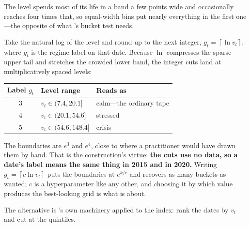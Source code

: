 The level spends most of its life in a band a few points wide and occasionally reaches four times
that, so equal-width bins put nearly everything in the first one---the opposite of what
's bucket test needs.

\begin{definition}\label{def:log-ceiling}
Take the natural log of the level and round up to the next integer,
$g_t = \left\lceil \ln v_t \right\rceil$, where $g_t$ is the regime label on that date. Because
$\ln$ compresses the sparse upper tail and stretches the crowded lower band, the integer cuts land
at multiplicatively spaced levels:

\begin{center}
\begin{tabular}{|c|l|l|}
\hline
\textbf{Label $g_t$} & \textbf{Level range} & \textbf{Reads as} \\ \hline
3 & $v_t \in (7.4, 20.1]$   & calm---the ordinary tape \\ \hline
4 & $v_t \in (20.1, 54.6]$  & stressed \\ \hline
5 & $v_t \in (54.6, 148.4]$ & crisis \\ \hline
\end{tabular}
\end{center}
\end{definition}

The boundaries are $e^3$ and $e^4$, close to where a practitioner would have drawn them by hand.
That is the construction's virtue: \textbf{the cuts use no data, so a date's label means the same
thing in 2015 and in 2020.} Writing $g_t = \left\lceil c \ln v_t \right\rceil$ puts the boundaries
at $e^{k/c}$ and recovers as many buckets as wanted; $c$ is a hyperparameter like any other, and
choosing it by which value produces the best-looking grid is what
 is about.

The alternative is 's own machinery applied to the index:
rank the dates by $v_t$ and cut at the quintiles.

